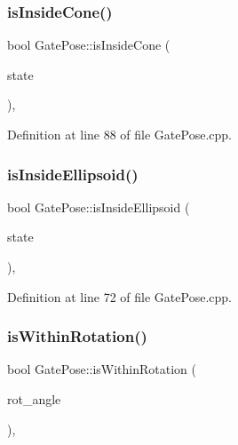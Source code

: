 \subsubsection{\texorpdfstring{is\+Inside\+Cone()}{isInsideCone()}}
{\footnotesize\ttfamily bool Gate\+Pose\+::is\+Inside\+Cone (\begin{DoxyParamCaption}\item[{const Eigen\+::\+Ref$<$ const Eigen\+::\+Vector\+Xf $>$ \&}]{state }\end{DoxyParamCaption})\hspace{0.3cm}{\ttfamily [protected]}, {\ttfamily [inherited]}}



Definition at line 88 of file Gate\+Pose.\+cpp.

\mbox{\label{classGatePose_a880273787b1b3542e1e7971954ac118d}} 
\subsubsection{\texorpdfstring{is\+Inside\+Ellipsoid()}{isInsideEllipsoid()}}
{\footnotesize\ttfamily bool Gate\+Pose\+::is\+Inside\+Ellipsoid (\begin{DoxyParamCaption}\item[{const Eigen\+::\+Ref$<$ const Eigen\+::\+Vector\+Xf $>$ \&}]{state }\end{DoxyParamCaption})\hspace{0.3cm}{\ttfamily [protected]}, {\ttfamily [inherited]}}



Definition at line 72 of file Gate\+Pose.\+cpp.

\mbox{\label{classGatePose_a6d188756ed5dcc56c311a2aafc9d1acd}} 
\subsubsection{\texorpdfstring{is\+Within\+Rotation()}{isWithinRotation()}}
{\footnotesize\ttfamily bool Gate\+Pose\+::is\+Within\+Rotation (\begin{DoxyParamCaption}\item[{float}]{rot\+\_\+angle }\end{DoxyParamCaption})\hspace{0.3cm}{\ttfamily [protected]}, {\ttfamily [inherited]}}



